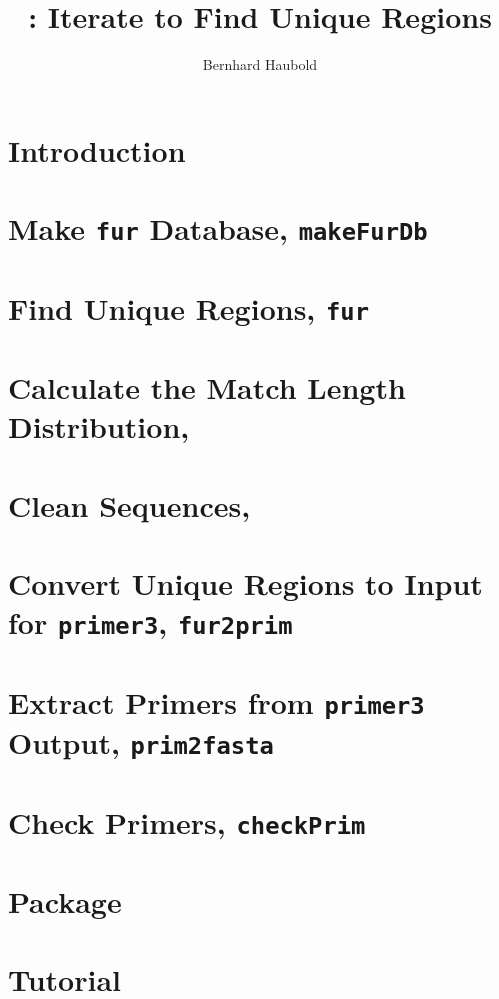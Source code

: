 \documentclass[a4paper]{report}
\begin{document}
\pagestyle{noweb}

\title{: Iterate  to Find Unique Regions}
\author{Bernhard Haubold}
\date{}
\maketitle

\tableofcontents

\chapter{Introduction}\label{sec:intro}

\chapter{Make \texttt{fur} Database, \texttt{makeFurDb}}\label{ch:makeFurDb}

\chapter{Find Unique Regions, \texttt{fur}}

\chapter{Calculate the Match Length Distribution, }\label{ch:mad}

\chapter{Clean Sequences, }

\chapter{Convert Unique Regions to Input for \texttt{primer3}, \texttt{fur2prim}}

\chapter{Extract Primers from \texttt{primer3}
Output, \texttt{prim2fasta}}

\chapter{Check Primers, \texttt{checkPrim}}

\chapter{Package }

\chapter{Tutorial}\label{ch:tut}



\end{document}
